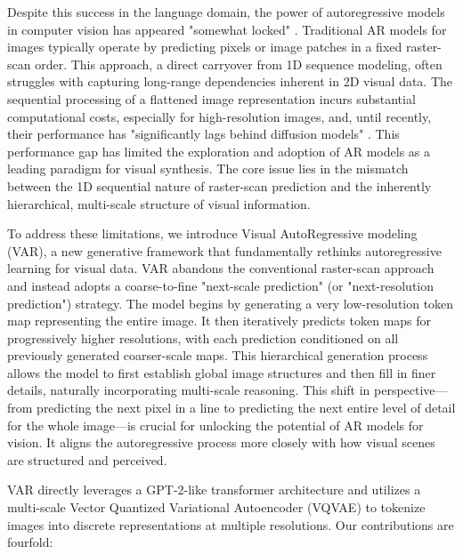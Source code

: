 \documentclass{article}
\begin{document}
Despite this success in the language domain, the power of autoregressive models in computer vision has appeared "somewhat locked" \cite{esser2021taming}. %
Traditional AR models for images typically operate by predicting pixels \cite{oord2016pixel} or image patches \cite{parmar2018image} in a fixed raster-scan order. This approach, a direct carryover from 1D sequence modeling, often struggles with capturing long-range dependencies inherent in 2D visual data. The sequential processing of a flattened image representation incurs substantial computational costs, especially for high-resolution images, and, until recently, their performance has "significantly lags behind diffusion models" \cite{dhariwal2021diffusion}. %
This performance gap has limited the exploration and adoption of AR models as a leading paradigm for visual synthesis. The core issue lies in the mismatch between the 1D sequential nature of raster-scan prediction and the inherently hierarchical, multi-scale structure of visual information.

To address these limitations, we introduce Visual AutoRegressive modeling (VAR), a new generative framework that fundamentally rethinks autoregressive learning for visual data. VAR abandons the conventional raster-scan approach and instead adopts a coarse-to-fine "next-scale prediction" (or "next-resolution prediction") strategy. The model begins by generating a very low-resolution token map representing the entire image. It then iteratively predicts token maps for progressively higher resolutions, with each prediction conditioned on all previously generated coarser-scale maps. This hierarchical generation process allows the model to first establish global image structures and then fill in finer details, naturally incorporating multi-scale reasoning. This shift in perspective—from predicting the next pixel in a line to predicting the next entire level of detail for the whole image—is crucial for unlocking the potential of AR models for vision. It aligns the autoregressive process more closely with how visual scenes are structured and perceived.

VAR directly leverages a GPT-2-like transformer architecture \cite{radford2019language} and utilizes a multi-scale Vector Quantized Variational Autoencoder (VQVAE) \cite{van2017neural, razavi2019generating} to tokenize images into discrete representations at multiple resolutions. Our contributions are fourfold:
\end{document}
